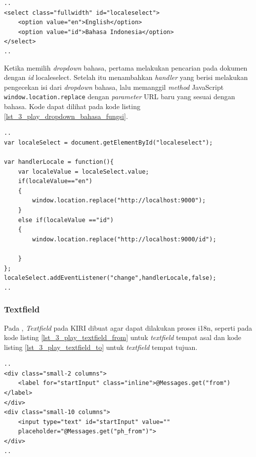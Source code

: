 \begin{lstlisting}[caption=Menampilkan pilihan bahasa kepada pengguna ,label = {lst_3_play_dropdown_bahasa_tampilan}]
..
<select class="fullwidth" id="localeselect">
    <option value="en">English</option>
    <option value="id">Bahasa Indonesia</option>
</select>
..
\end{lstlisting}

Ketika memilih \textit{dropdown} bahasa, pertama melakukan pencarian pada dokumen dengan \textit{id} localeselect. Setelah itu menambahkan \textit{handler} yang berisi melakukan pengecekan isi dari \textit{dropdown} bahasa, lalu memanggil \textit{method} JavaScript \verb!window.location.replace! dengan \textit{parameter} URL baru yang sesuai dengan bahasa. Kode dapat dilihat pada kode listing \ref{lst_3_play_dropdown_bahasa_fungsi}.

\begin{lstlisting}[caption=Fungsi JavaScript untuk Internationalization ,label = {lst_3_play_dropdown_bahasa_fungsi}]
..
var localeSelect = document.getElementById("localeselect");

var handlerLocale = function(){
    var localeValue = localeSelect.value;
    if(localeValue=="en")
    {
        window.location.replace("http://localhost:9000");
    }
    else if(localeValue =="id")
    {
        window.location.replace("http://localhost:9000/id");

    }
};
localeSelect.addEventListener("change",handlerLocale,false);
..
\end{lstlisting}


\subsubsection{Textfield}
Pada \play, \textit{Textfield} pada KIRI dibuat  agar dapat dilakukan proses i18n, seperti pada kode listing \ref{lst_3_play_textfield_from} untuk \textit{textfield} tempat asal dan kode listing \ref{lst_3_play_textfield_to} untuk \textit{textfield} tempat tujuan.

\begin{lstlisting}[caption=Menampilkan \textit{textfield} tempat awal kepada pengguna ,label = {lst_3_play_textfield_from}]
..
<div class="small-2 columns">
    <label for="startInput" class="inline">@Messages.get("from")</label>
</div>
<div class="small-10 columns">
    <input type="text" id="startInput" value=""
    placeholder="@Messages.get("ph_from")">
</div>
..
\end{lstlisting}

